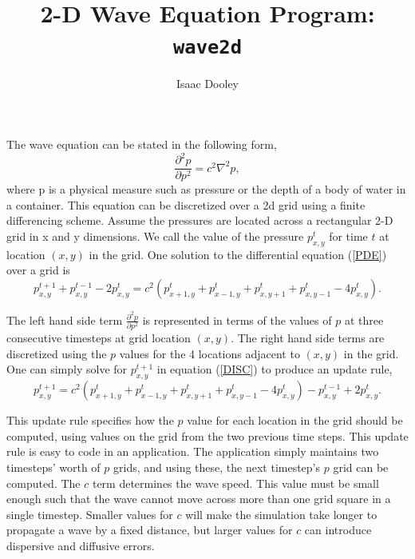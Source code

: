 \documentclass{article}
\begin{document}
\title{2-D Wave Equation Program:  \texttt{wave2d}}
\author{ Isaac Dooley }



\maketitle

The wave equation can be stated in the following form, 
\begin{equation}
\frac{\partial^2p}{\partial p^2}=c^2 \nabla^2 p ,\label{PDE}
\end{equation}
where p is a physical measure such as pressure or the depth of a body of water in a container. This equation can be discretized over a 2d grid using a finite differencing scheme. Assume the pressures are located across a rectangular 2-D grid in x and y dimensions. We call the value of the pressure $p_{x,y}^{t}$ for time $t$ at location $\left(x,y\right)$ in the grid. One solution to the differential equation (\ref{PDE}) over a grid is 
\begin{equation}
p_{x,y}^{t+1} + p_{x,y}^{t-1} -2 p_{x,y}^{t} = c^2 \left(p_{x+1,y}^{t}+p_{x-1,y}^{t}+p_{x,y+1}^{t}+p_{x,y-1}^{t}-4p_{x,y}^{t}\right).\label{DISC}
\end{equation}

The left hand side term $\frac{\partial^2p}{\partial p^2}$ is represented in terms of the values of $p$ at three consecutive timesteps at grid location $\left(x,y\right)$. The right hand side terms are discretized using the $p$ values for the 4 locations adjacent to $\left(x,y\right)$ in the grid. One can simply solve for $p_{x,y}^{t+1}$ in equation (\ref{DISC}) to produce an update rule, 
\begin{equation}
p_{x,y}^{t+1} = c^2 \left(p_{x+1,y}^{t}+p_{x-1,y}^{t}+p_{x,y+1}^{t}+p_{x,y-1}^{t}-4p_{x,y}^{t}\right)- p_{x,y}^{t-1} +2 p_{x,y}^{t} .
\end{equation}

This update rule specifies how the $p$ value for each location in the grid should be computed, using values on the grid from the two previous time steps. This update rule is easy to code in an application. The application simply maintains two timesteps' worth of $p$ grids, and using these, the next timestep's $p$ grid can be computed. The $c$ term determines the wave speed. This value must be small enough such that the wave cannot move across more than one grid square in a single timestep. Smaller values for $c$ will make the simulation take longer to propagate a wave by a fixed distance, but larger values for $c$ can introduce dispersive and diffusive errors.
\end{document}
